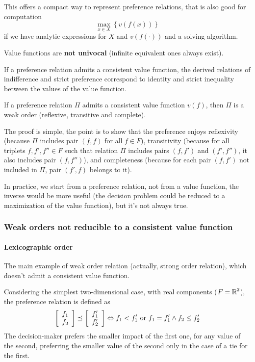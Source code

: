 This offers a compact way to represent preference relations, that is also good for computation
$$ \max_{x \in X} \left\{ v\left(f(x)\right) \right\}$$
if we have analytic expressions for $X$ and $v\left( f (\cdot)\right)$ and a solving algorithm.

Value functions are \textbf{not univocal} (infinite equivalent ones always exist).

If a preference relation admits a consistent value function, the derived relations of indifference and strict preference correspond to identity and strict inequality between the values of the value function. \\

\begin{theo}
	If a preference relation $\Pi$ admits a consistent value function $v(f)$, then $\Pi$ is a weak order (reflexive, transitive and complete).
\end{theo}

The proof is simple, the point is to show that the preference enjoys reflexivity (because $\Pi$ includes pair $(f,f)$ for all $f \in F$), transitivity (because for all triplets $f, f', f'' \in F$ such that relation $\Pi$ includes pairs $(f,f')$ and $(f', f'')$, it also includes pair $(f, f'')$), and completeness (because for each pair $(f, f')$ not included in $\Pi$, pair $(f',f)$ belongs to it).

In practice, we start from a preference relation, not from a value function, the inverse would be more useful (the decision problem could be reduced to a maximization of the value function), but it's not always true.

\subsubsection{Weak orders not reducible to a consistent value function}

\paragraph{Lexicographic order} The main example of weak order relation (actually, strong order relation), which doesn't admit a consistent value function. 

Considering the simplest two-dimensional case, with real components ($F = \operatorname{\mathbb{R}}^2$), the preference relation is defined as
$$ 
\left[
\begin{array}{c}
	f_1 \\
	f_2
\end{array}
\right] \preceq_{}  \left[
\begin{array}{c}
	f_1' \\
	f_2'
\end{array}
\right]
\Leftrightarrow f_1 < f_1' \text{ or } f_1 = f_1' \wedge f_2 \leq f_2'
$$
The decision-maker prefers the smaller impact of the first one, for any value of the second, preferring the smaller value of the second only in the case of a tie for the first.

